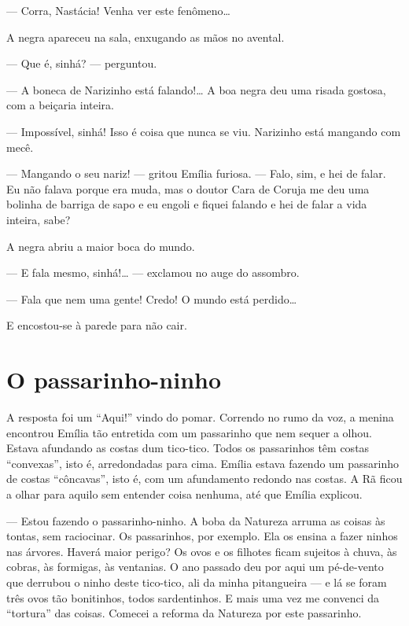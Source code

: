 --- Corra, Nastácia! Venha ver este fenômeno\ldots{}

A negra apareceu na sala, enxugando as mãos no avental.

--- Que é, sinhá? --- perguntou.

--- A boneca de Narizinho está falando!\ldots{} A boa negra deu uma
risada gostosa, com a beiçaria inteira.

--- Impossível, sinhá! Isso é coisa que nunca se viu. Narizinho está
mangando com mecê.

--- Mangando o seu nariz! --- gritou Emília furiosa. --- Falo, sim, e
hei de falar. Eu não falava porque era muda, mas o doutor Cara de Coruja
me deu uma bolinha de barriga de sapo e eu engoli e fiquei falando e hei
de falar a vida inteira, sabe?

A negra abriu a maior boca do mundo.

--- E fala mesmo, sinhá!\ldots{} --- exclamou no auge do assombro.

--- Fala que nem uma gente! Credo! O mundo está perdido\ldots{}

E encostou-se à parede para não cair.


\chapter{O passarinho-ninho}

A resposta foi um ``Aqui!'' vindo do pomar. Correndo no rumo da voz, a
menina encontrou Emília tão entretida com um passarinho que nem sequer a
olhou. Estava afundando as costas dum tico-tico. Todos os passarinhos
têm costas ``convexas'', isto é, arredondadas para cima. Emília estava
fazendo um passarinho de costas ``côncavas'', isto é, com um afundamento
redondo nas costas. A Rã ficou a olhar para aquilo sem entender coisa
nenhuma, até que Emília explicou.

--- Estou fazendo o passarinho-ninho. A boba da Natureza arruma as
coisas às tontas, sem raciocinar. Os passarinhos, por exemplo. Ela os
ensina a fazer ninhos nas árvores. Haverá maior perigo? Os ovos e os
filhotes ficam sujeitos à chuva, às cobras, às formigas, às ventanias. O
ano passado deu por aqui um pé-de-vento que derrubou o ninho deste
tico-tico, ali da minha pitangueira --- e lá se foram três ovos tão
bonitinhos, todos sardentinhos. E mais uma vez me convenci da
``tortura'' das coisas. Comecei a reforma da Natureza por este
passarinho.

